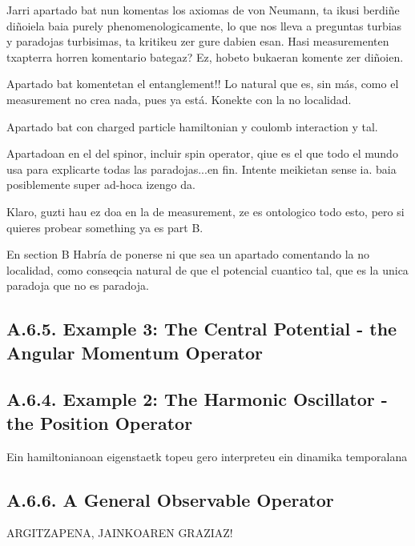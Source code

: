 \documentclass[11pt, a4paper]{article} %
\begin{document}
Jarri apartado bat nun komentas los axiomas de von Neumann, ta ikusi berdiñe diñoiela baia purely phenomenologicamente, lo que nos lleva a preguntas turbias y paradojas turbisimas, ta kritikeu zer gure dabien esan. Hasi measurementen txapterra horren komentario bategaz? Ez, hobeto bukaeran komente zer diñoien.

Apartado bat komentetan el entanglement!! Lo natural que es, sin más, como el measurement no crea nada, pues ya está. Konekte con la no localidad.

Apartado bat con charged particle hamiltonian y coulomb interaction y tal.

Apartadoan en el del spinor, incluir spin operator, qiue es el que todo el mundo usa para explicarte todas las paradojas...en fin. Intente meikietan sense ia. baia posiblemente super ad-hoca izengo da.

Klaro, guzti hau ez doa en la de measurement, ze es ontologico todo esto, pero si quieres probear something ya es part B.

En section B Habría de ponerse ni que sea un apartado comentando la no localidad, como conseqcia natural de que el potencial cuantico tal, que es la unica paradoja que no es paradoja.







\subsection*{A.6.5. Example 3: The Central Potential - the Angular Momentum Operator}


\subsection*{A.6.4. Example 2: The Harmonic Oscillator - the Position Operator}
Ein hamiltonianoan eigenstaetk topeu gero interpreteu ein dinamika temporalana 

\subsection*{A.6.6. A General Observable Operator}
ARGITZAPENA, JAINKOAREN GRAZIAZ!
\end{document}
